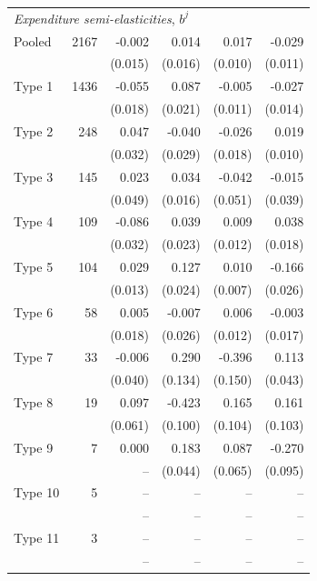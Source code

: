 \begin{table}[htbp]
\begin{tabular}{lrrrrr}
\midrule
\multicolumn{6}{l}{\textit{Expenditure semi-elasticities}, $b^j$} \\
Pooled & 2167 & -0.002 & 0.014 & 0.017 & -0.029 \\
 & & (0.015) & (0.016) & (0.010) & (0.011) \\
\addlinespace
Type 1 & 1436 & -0.055 & 0.087 & -0.005 & -0.027 \\
 & & (0.018) & (0.021) & (0.011) & (0.014) \\
Type 2 & 248 & 0.047 & -0.040 & -0.026 & 0.019 \\
 & & (0.032) & (0.029) & (0.018) & (0.010) \\
Type 3 & 145 & 0.023 & 0.034 & -0.042 & -0.015 \\
 & & (0.049) & (0.016) & (0.051) & (0.039) \\
Type 4 & 109 & -0.086 & 0.039 & 0.009 & 0.038 \\
 & & (0.032) & (0.023) & (0.012) & (0.018) \\
Type 5 & 104 & 0.029 & 0.127 & 0.010 & -0.166 \\
 & & (0.013) & (0.024) & (0.007) & (0.026) \\
Type 6 & 58 & 0.005 & -0.007 & 0.006 & -0.003 \\
 & & (0.018) & (0.026) & (0.012) & (0.017) \\
Type 7 & 33 & -0.006 & 0.290 & -0.396 & 0.113 \\
 & & (0.040) & (0.134) & (0.150) & (0.043) \\
Type 8 & 19 & 0.097 & -0.423 & 0.165 & 0.161 \\
 & & (0.061) & (0.100) & (0.104) & (0.103) \\
Type 9 & 7 & 0.000 & 0.183 & 0.087 & -0.270 \\
 & & -- & (0.044) & (0.065) & (0.095) \\
Type 10 & 5 & -- & -- & -- & -- \\
 & & -- & -- & -- & -- \\
Type 11 & 3 & -- & -- & -- & -- \\
 & & -- & -- & -- & -- \\
\bottomrule
\end{tabular}
\end{table}
